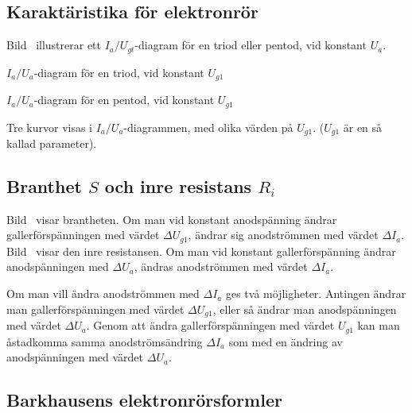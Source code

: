 \subsection{Karaktäristika för elektronrör}

Bild~ illustrerar ett \(I_a/U_{gt}\)-diagram för en triod
eller pentod, vid konstant \(U_a\).

\(I_a/U_a\)-diagram för en triod, vid konstant \(U_{g1}\)

\(I_a/U_a\)-diagram för en pentod, vid konstant \(U_{g1}\)

Tre kurvor visas i \(I_a/U_a\)-diagrammen, med olika värden på
\(U_{g1}\). (\(U_{g1}\) är en så kallad parameter).

\newpage
{}

\subsection{Branthet $S$ och inre resistans $R_i$}

Bild~ visar brantheten.
Om man vid konstant anodspänning ändrar gallerförspänningen med värdet
\(\Delta U_{g1}\), ändrar sig anodströmmen med värdet \(\Delta I_a\).
Bild~ visar den inre resistansen.
Om man vid konstant gallerförspänning ändrar anodspänningen med
\(\Delta U_a\), ändras anodströmmen med värdet \(\Delta I_a\).

\noindent
Om man vill ändra anodströmmen med \(\Delta I_a\) ges två möjligheter.
Antingen ändrar man gallerförspänningen med värdet \(\Delta U_{g1}\), eller så
ändrar man anodspänningen med värdet \(\Delta U_a\).
Genom att ändra gallerförspänningen med värdet \(U_{g1}\) kan man åstadkomma
samma anodströmsändring \(\Delta I_a\) som med en ändring av anodspänningen
med värdet \(\Delta U_a\).

\subsection{Barkhausens elektronrörsformler}

